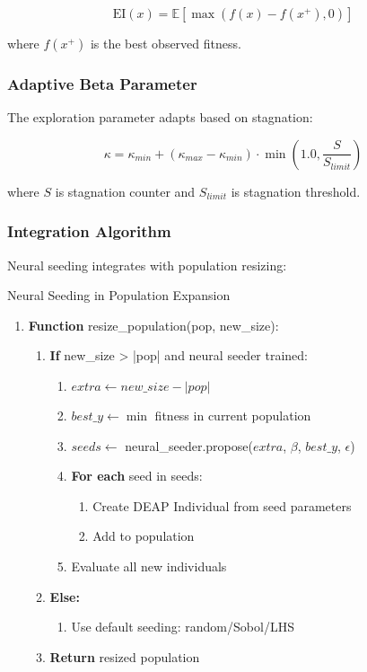 \documentclass[12pt,a4paper]{article}
\begin{document}
\begin{equation}\label{Eq.neural_ei}
\text{EI}(x) = \mathbb{E}[\max(f(x) - f(x^+), 0)]
\end{equation}

where $f(x^+)$ is the best observed fitness.

\subsubsection{Adaptive Beta Parameter}

The exploration parameter adapts based on stagnation:

\begin{equation}\label{Eq.adaptive_beta}
\kappa = \kappa_{min} + (\kappa_{max} - \kappa_{min}) \cdot \min\left(1.0, \frac{S}{S_{limit}}\right)
\end{equation}

where $S$ is stagnation counter and $S_{limit}$ is stagnation threshold.

\subsubsection{Integration Algorithm}

Neural seeding integrates with population resizing:

\begin{algorithm}
\caption{Neural Seeding in Population Expansion}
\begin{enumerate}
    \item \textbf{Function} resize\_population(pop, new\_size):
    \begin{enumerate}
        \item \textbf{If} new\_size > |pop| and neural seeder trained:
        \begin{enumerate}
            \item $extra \leftarrow new\_size - |pop|$
            \item $best\_y \leftarrow \min$ fitness in current population
            \item $seeds \leftarrow$ neural\_seeder.propose($extra$, $\beta$, $best\_y$, $\epsilon$)
            \item \textbf{For each} seed in seeds:
            \begin{enumerate}
                \item Create DEAP Individual from seed parameters
                \item Add to population
            \end{enumerate}
            \item Evaluate all new individuals
        \end{enumerate}
        \item \textbf{Else:}
        \begin{enumerate}
            \item Use default seeding: random/Sobol/LHS
        \end{enumerate}
        \item \textbf{Return} resized population
    \end{enumerate}
\end{enumerate}
\end{algorithm}
\end{document}

